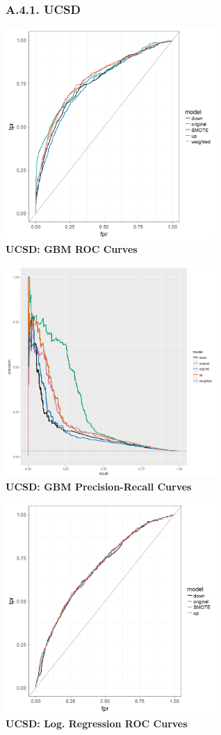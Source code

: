 \documentclass[12pt,]{article}
\begin{document}
\justify

\clearpage

\hypertarget{a.4.1.-ucsd}{%
\subsubsection{A.4.1. UCSD}\label{a.4.1.-ucsd}}

\center

\includegraphics[width=0.6\textwidth,height=\textheight]{figures/ucsd/ucsd_gbm_rocs.png}\\
\textbf{UCSD: GBM ROC Curves}

\includegraphics[width=0.6\textwidth,height=\textheight]{figures/ucsd/ucsd_gbm_PR.png}\\
\textbf{UCSD: GBM Precision-Recall Curves}

\includegraphics[width=0.6\textwidth,height=\textheight]{figures/ucsd/ucsd_glm_rocs.png}\\
\textbf{UCSD: Log. Regression ROC Curves}
\end{document}

